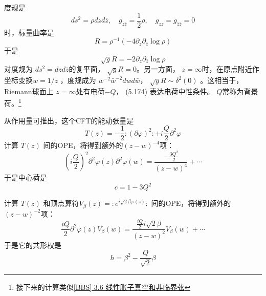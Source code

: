 度规是
\begin{equation}
	d s^{2}=\rho d z d \bar{z}, \quad g_{z \bar{z}}=\frac{1}{2} \rho, \quad g_{z z}=g_{\bar{z} \bar{z}}=0
\end{equation}
时，标量曲率是
\begin{equation}
	R=\rho^{-1}\left(-4 \partial_{z} \partial_{\bar{z}} \log \rho\right)
\end{equation}
于是
$$
\sqrt{g} R=-2 \partial_{z} \partial_{\bar{z}} \log \rho
$$
对度规为 $d s^{2}=d z d \bar{z} $的复平面， $\sqrt{g} R=0 $。另一方面， $z=\infty $时，在原点附近作坐标变换$ w=1/z$ ，度规成为 $w^{-2} \bar{w}^{-2} d w d \bar{w} $， $\sqrt{g} R \sim \delta^{2}(0)$ 。这相当于，Riemann球面上 $z=\infty $处有电荷$ -Q $， (5.174) 表达电荷中性条件。 $Q $常称为背景荷。\footnote{接下来的计算类似\href{https://zhuanlan.zhihu.com/p/150578081}{[BBS] 3.6 线性胀子真空和非临界弦}}

从作用量可推出，这个CFT的能动张量是
\begin{equation}
	T(z)=-\frac{1}{2}:(\partial \varphi)^{2}:+i \frac{Q}{2} \partial^{2} \varphi 
\end{equation}
计算 $T(z)$ 间的OPE，将得到额外的$ (z-w)^{-4} $项：
\begin{equation}
	\left(i \frac{Q}{2}\right)^{2} \partial^{2} \varphi(z) \partial^{2} \varphi(w)=\frac{-\frac{3 Q^{2}}{2}}{(z-w)^{4}}+\cdots 
\end{equation}
于是中心荷是
\begin{equation}
	c=1-3 Q^{2} 
\end{equation}

计算 $T(z)$ 和顶点算符$ V_{\beta}(z)=: e^{i \sqrt{2} \beta \varphi(z)}:$ 间的OPE，将得到额外的$ (z-w)^{-2} $项：
\begin{equation}
	\frac{i Q}{2} \partial^{2} \varphi(z) V_{\beta}(w)=\frac{\frac{i Q}{2} i \sqrt{2} \beta}{(z-w)^{2}} V_{\beta}(w)+\cdots 
\end{equation}
于是它的共形权是
\begin{equation}
	h=\beta^{2}-\frac{Q}{\sqrt{2}} \beta
\end{equation} 


